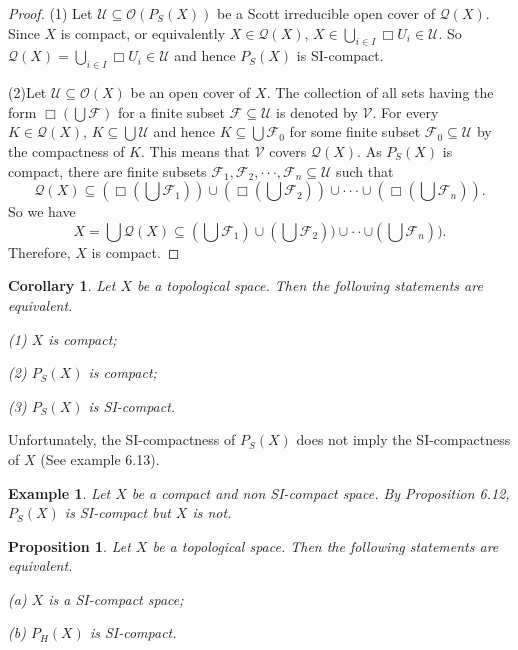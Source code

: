 \documentclass[preprint,12pt]{elsarticle}
\numberwithin{equation}{section}
\newtheorem{proposition}[theorem]{Proposition}
\newtheorem{corollary}[theorem]{Corollary}
\newtheorem{example}[theorem]{Example}
\begin{document}
\begin{proof}(1) Let $\mathcal{U}\subseteq\mathcal{O}(P_{S}(X))$ be a Scott irreducible open cover of $\mathcal{Q}(X)$.  Since $X$ is compact, or equivalently $X\in\mathcal{Q}(X)$, $X\in \bigcup\limits_{i\in I}\Box U_{i}\in\mathcal{U}$. So $\mathcal{Q}(X)=\bigcup\limits_{i\in I}\Box U_{i}\in\mathcal{U}$ and hence $P_{S}(X)$ is SI-compact.

(2)Let $\mathcal{U}\subseteq\mathcal{O}(X)$ be an open cover of $X$. The collection of all sets having the form $\Box(\bigcup\mathcal{F})$ for a finite subset $\mathcal{F}\subseteq\mathcal{U}$ is denoted by $\mathcal{V}$. For every $K\in\mathcal{Q}(X)$, $K\subseteq\bigcup\mathcal{U}$ and hence $K\subseteq\bigcup\mathcal{F}_{0}$ for some finite subset $\mathcal{F}_{0}\subseteq\mathcal{U}$ by the compactness of $K$. This means that $\mathcal{V}$ covers $\mathcal{Q}(X)$. As $P_{S}(X)$ is compact, there are finite subsets $\mathcal{F}_{1},\mathcal{F}_{2},\cdot\cdot\cdot,\mathcal{F}_{n}\subseteq\mathcal{U}$ such that $$\mathcal{Q}(X)\subseteq(\Box(\bigcup\mathcal{F}_{1}))\cup(\Box(\bigcup\mathcal{F}_{2}))\cup\cdot\cdot\cdot\cup(\Box(\bigcup\mathcal{F}_{n})).$$ So we have $$X=\bigcup\mathcal{Q}(X)\subseteq(\bigcup\mathcal{F}_{1})\cup(\bigcup\mathcal{F}_{2}))\cup\cdot\cdot\cup(\bigcup\mathcal{F}_{n})).$$ Therefore, $X$ is compact.\end{proof}

\begin{corollary}Let $X$ be a topological space. Then the following statements are equivalent.

{\rm(1)} $X$ is compact;

{\rm(2)} $P_{S}(X)$ is compact;

{\rm(3)} $P_{S}(X)$ is SI-compact.

\end{corollary}

\quad Unfortunately, the SI-compactness of $P_{S}(X)$ does not imply the SI-compactness of $X$ (See example 6.13).

\begin{example} Let $X$ be a compact and non SI-compact space. By Proposition 6.12, $P_{S}(X)$ is SI-compact but $X$ is not.
\end{example}

\begin{proposition} Let $X$ be a topological space. Then the following statements are equivalent.

(a) $X$ is a SI-compact space;

(b) $P_{H}(X)$ is SI-compact.
\end{proposition}
\end{document}

